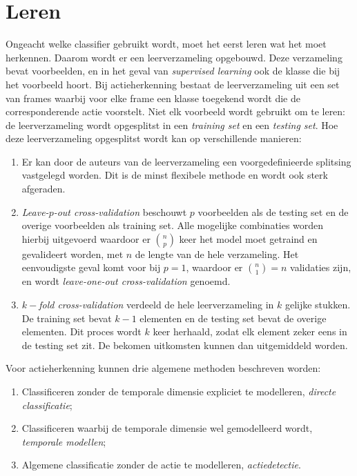\section{Leren}
Ongeacht welke classifier gebruikt wordt, moet het eerst leren wat het moet herkennen. Daarom wordt er een leerverzameling opgebouwd. Deze verzameling bevat voorbeelden, en in het geval van \textit{supervised learning} ook de klasse die bij het voorbeeld hoort. Bij actieherkenning bestaat de leerverzameling uit een set van frames waarbij voor elke frame een klasse toegekend wordt die de corresponderende actie voorstelt. Niet elk voorbeeld wordt gebruikt om te leren: de leerverzameling wordt opgesplitst in een \textit{training set} en een \textit{testing set}. Hoe deze leerverzameling opgesplitst wordt kan op verschillende manieren:
\begin{enumerate}
	\item Er kan door de auteurs van de leerverzameling een voorgedefinieerde splitsing vastgelegd worden. Dit is de minst flexibele methode en wordt ook sterk afgeraden. 
	\item \textit{Leave-$p$-out cross-validation} beschouwt $p$ voorbeelden als de testing set en de overige voorbeelden als training set. Alle mogelijke combinaties worden hierbij uitgevoerd waardoor er $\binom{n}{p}$ keer het model moet getraind en gevalideert worden, met $n$ de lengte van de hele verzameling. Het eenvoudigste geval komt voor bij $p = 1$, waardoor er $\binom{n}{1} = n$ validaties zijn, en wordt \textit{leave-one-out cross-validation} genoemd.
	\item \textit{$k-$fold cross-validation} verdeeld de hele leerverzameling in $k$ gelijke stukken. De training set bevat $k - 1$ elementen en de testing set bevat de overige elementen. Dit proces wordt $k$ keer herhaald, zodat elk element zeker eens in de testing set zit. De bekomen uitkomsten kunnen dan uitgemiddeld worden.	
\end{enumerate} 





Voor actieherkenning kunnen drie algemene methoden beschreven worden:
\begin{enumerate}
	\item Classificeren zonder de temporale dimensie expliciet te modelleren, \textit{directe classificatie};
	\item Classificeren waarbij de temporale dimensie wel gemodelleerd wordt, \textit{temporale modellen};
	\item Algemene classificatie zonder de actie te modelleren, \textit{actiedetectie}.
\end{enumerate}


